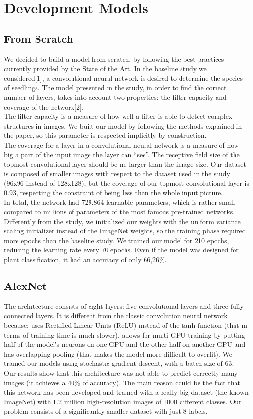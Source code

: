 \documentclass[11pt, oneside]{article}
\begin{document}
\section{Development Models}
\subsection{From Scratch}
We decided to build a model from scratch, by following the best practices currently provided by the State of the Art. In the baseline study we considered[1],  a convolutional neural network is desired to determine the species of seedlings. 
The model presented in the study, in order to find the correct number of layers, takes into account two properties: the filter capacity and coverage of the network[2]. \\
The filter capacity is a measure of how well a filter is able to detect complex structures in images. 
We built our model by following the methods explained in the paper, so this parameter is respected implicitly by construction. \\
The coverage for a layer in a convolutional neural network is a measure of how big a part of the input image the layer can “see”. 
The receptive field size of the topmost convolutional layer should be no larger than the image size. Our dataset is composed of smaller images with respect to the dataset used in the study (96x96 instead of 128x128), but the coverage of our topmost convolutional layer is 0.93, respecting the constraint of being less than the whole input picture. \\
In total, the network had 729.864 learnable parameters, which is rather small compared to millions of parameters of the most famous pre-trained networks. Differently from the study, we initialized our weights with the uniform variance scaling initializer instead of the ImageNet weights, so the training phase required more epochs than the baseline study. We trained our model for 210 epochs, reducing the learning rate every 70 epochs. Even if the model was designed for plant classification, it had an accuracy of only 66,26\%.
\subsection{AlexNet}
The architecture consists of eight layers: five convolutional layers and three fully-connected layers. It is different from the classic convolution neural network because: uses Rectified Linear Units (ReLU) instead of the tanh function (that in terms of training time is much slower), allows for multi-GPU training by putting half of the model’s neurons on one GPU and the other half on another GPU and has overlapping pooling (that makes the model more difficult to overfit).
We trained our models using stochastic gradient descent, with a batch size of 63.\\
Our results show that this architecture was not able to predict correctly many images (it achieves a 40\% of accuracy). The main reason could be the fact that this network has been developed and trained with a really big dataset (the known ImageNet) with  1.2 million high-resolution images of 1000 different classes. Our problem consists of a significantly smaller dataset with just 8 labels.
\end{document}
